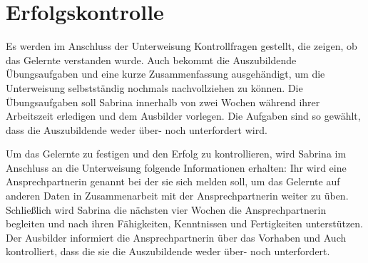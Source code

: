 
\section{Erfolgskontrolle}
Es werden im Anschluss der Unterweisung Kontrollfragen gestellt, die zeigen, ob das Gelernte verstanden wurde. Auch bekommt die Auszubildende Übungsaufgaben und eine kurze Zusammenfassung ausgehändigt, um die Unterweisung selbstständig nochmals nachvollziehen zu können. Die Übungsaufgaben soll Sabrina innerhalb von zwei Wochen während ihrer Arbeitszeit erledigen und dem Ausbilder vorlegen. Die Aufgaben sind so gewählt, dass die Auszubildende weder über- noch unterfordert wird.
\par
Um das Gelernte zu festigen und den Erfolg zu kontrollieren, wird Sabrina im Anschluss an die Unterweisung folgende Informationen erhalten: Ihr wird eine Ansprechpartnerin genannt bei der sie sich melden soll, um das Gelernte auf anderen Daten in Zusammenarbeit mit der Ansprechpartnerin weiter zu üben. Schließlich wird Sabrina die nächsten vier Wochen die Ansprechpartnerin begleiten und nach ihren Fähigkeiten, Kenntnissen und Fertigkeiten unterstützen. Der Ausbilder informiert die Ansprechpartnerin über das Vorhaben und Auch kontrolliert, dass die sie die Auszubildende weder über- noch unterfordert. 


